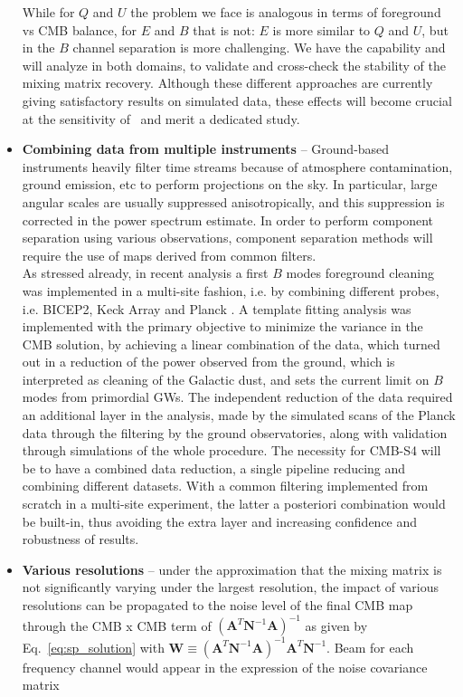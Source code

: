 \begin{itemize}
While for $Q$ and $U$ the problem we face is analogous in terms of foreground vs CMB balance, for $E$ and $B$ that is not: $E$ is more similar to $Q$ and $U$, but in the $B$ channel separation is more challenging. We have the capability and will analyze in both domains, to validate and cross-check the stability of the mixing matrix recovery.
Although these different approaches are currently giving satisfactory results on simulated data, these effects will become crucial at the sensitivity of \cmbexp\ and merit a dedicated study. 
	\item \textbf{Combining data from multiple instruments} -- Ground-based instruments heavily filter time streams because of atmosphere contamination, ground emission, etc to perform projections on the sky. In particular, large angular scales are usually suppressed anisotropically, and this suppression is corrected in the power spectrum estimate. In order to perform component separation using various observations, component separation methods will require the use of maps derived from common filters. \\
	As stressed already, in recent analysis a first $B$ modes foreground cleaning was implemented in a multi-site fashion, i.e. by combining different probes, i.e. BICEP2, Keck Array and Planck \cite{bicepkeckplanck15}. A template fitting analysis was implemented with the primary objective to minimize the variance in the CMB solution, by achieving a linear combination of the data, which turned out in a reduction of the power observed from the ground, which is interpreted as cleaning of the Galactic dust, and sets the current limit on $B$ modes from primordial GWs. The independent reduction of the data required an additional layer in the analysis, made by the simulated scans of the Planck data through the filtering by the ground observatories, along with validation through simulations of the whole procedure. The necessity for CMB-S4 will be to have a combined data reduction, a single pipeline reducing and combining different datasets. With a common filtering implemented from scratch in a multi-site experiment, the latter a posteriori combination would be built-in, thus avoiding the extra layer and increasing confidence and robustness of results.
	\item \textbf{Various resolutions} -- under the approximation that the mixing matrix is not significantly varying under the largest resolution, the impact of various resolutions can be propagated to the noise level of the final CMB map through the CMB x CMB term of $\left(\mathbf{A}^T\mathbf{N}^{-1}\mathbf{A}\right)^{-1}$ as given by Eq.~\ref{eq:sp_solution} with $\mathbf{W} \equiv \left( \mathbf{A}^T\mathbf{N}^{-1}\mathbf{A} \right)^{-1}\mathbf{A}^T\mathbf{N}^{-1}$. Beam for each frequency channel would appear in the expression of the noise covariance matrix 

\end{itemize}
